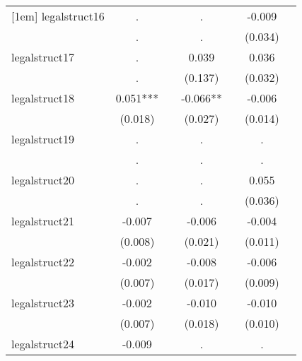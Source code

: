 {\begin{tabular}{l*{6}{c}}
[1em]
legalstruct16&           .   &               &           .   &               &      -0.009   &               \\
            &           .   &               &           .   &               &     (0.034)   &               \\
[1em]
legalstruct17&           .   &               &       0.039   &               &       0.036   &               \\
            &           .   &               &     (0.137)   &               &     (0.032)   &               \\
[1em]
legalstruct18&       0.051***&               &      -0.066** &               &      -0.006   &               \\
            &     (0.018)   &               &     (0.027)   &               &     (0.014)   &               \\
[1em]
legalstruct19&           .   &               &           .   &               &           .   &               \\
            &           .   &               &           .   &               &           .   &               \\
[1em]
legalstruct20&           .   &               &           .   &               &       0.055   &               \\
            &           .   &               &           .   &               &     (0.036)   &               \\
[1em]
legalstruct21&      -0.007   &               &      -0.006   &               &      -0.004   &               \\
            &     (0.008)   &               &     (0.021)   &               &     (0.011)   &               \\
[1em]
legalstruct22&      -0.002   &               &      -0.008   &               &      -0.006   &               \\
            &     (0.007)   &               &     (0.017)   &               &     (0.009)   &               \\
[1em]
legalstruct23&      -0.002   &               &      -0.010   &               &      -0.010   &               \\
            &     (0.007)   &               &     (0.018)   &               &     (0.010)   &               \\
[1em]
legalstruct24&      -0.009   &               &           .   &               &           .   &               \\

\end{tabular}}
